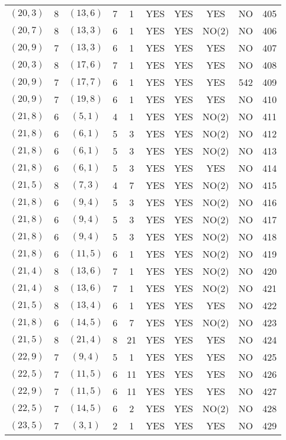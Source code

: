 \begin{longtable}{|c|c|c|c|c|c|c|c|c|c|}
$(20, 3)$ & 8 & $(13, 6)$ & 7 & 1 & YES & YES & YES & NO & 405\\
$(20, 7)$ & 8 & $(13, 3)$ & 6 & 1 & YES & YES & NO(2) & NO & 406\\
$(20, 9)$ & 7 & $(13, 3)$ & 6 & 1 & YES & YES & YES & NO & 407\\
$(20, 3)$ & 8 & $(17, 6)$ & 7 & 1 & YES & YES & YES & NO & 408\\
$(20, 9)$ & 7 & $(17, 7)$ & 6 & 1 & YES & YES & YES & 542 & 409\\
$(20, 9)$ & 7 & $(19, 8)$ & 6 & 1 & YES & YES & YES & NO & 410\\
$(21, 8)$ & 6 & $(5, 1)$ & 4 & 1 & YES & YES & NO(2) & NO & 411\\
$(21, 8)$ & 6 & $(6, 1)$ & 5 & 3 & YES & YES & NO(2) & NO & 412\\
$(21, 8)$ & 6 & $(6, 1)$ & 5 & 3 & YES & YES & NO(2) & NO & 413\\
$(21, 8)$ & 6 & $(6, 1)$ & 5 & 3 & YES & YES & YES & NO & 414\\
$(21, 5)$ & 8 & $(7, 3)$ & 4 & 7 & YES & YES & NO(2) & NO & 415\\
$(21, 8)$ & 6 & $(9, 4)$ & 5 & 3 & YES & YES & NO(2) & NO & 416\\
$(21, 8)$ & 6 & $(9, 4)$ & 5 & 3 & YES & YES & NO(2) & NO & 417\\
$(21, 8)$ & 6 & $(9, 4)$ & 5 & 3 & YES & YES & NO(2) & NO & 418\\
$(21, 8)$ & 6 & $(11, 5)$ & 6 & 1 & YES & YES & NO(2) & NO & 419\\
$(21, 4)$ & 8 & $(13, 6)$ & 7 & 1 & YES & YES & NO(2) & NO & 420\\
$(21, 4)$ & 8 & $(13, 6)$ & 7 & 1 & YES & YES & NO(2) & NO & 421\\
$(21, 5)$ & 8 & $(13, 4)$ & 6 & 1 & YES & YES & YES & NO & 422\\
$(21, 8)$ & 6 & $(14, 5)$ & 6 & 7 & YES & YES & NO(2) & NO & 423\\
$(21, 5)$ & 8 & $(21, 4)$ & 8 & 21 & YES & YES & YES & NO & 424\\
$(22, 9)$ & 7 & $(9, 4)$ & 5 & 1 & YES & YES & YES & NO & 425\\
$(22, 5)$ & 7 & $(11, 5)$ & 6 & 11 & YES & YES & YES & NO & 426\\
$(22, 9)$ & 7 & $(11, 5)$ & 6 & 11 & YES & YES & YES & NO & 427\\
$(22, 5)$ & 7 & $(14, 5)$ & 6 & 2 & YES & YES & NO(2) & NO & 428\\
$(23, 5)$ & 7 & $(3, 1)$ & 2 & 1 & YES & YES & YES & NO & 429\\

\end{longtable}

